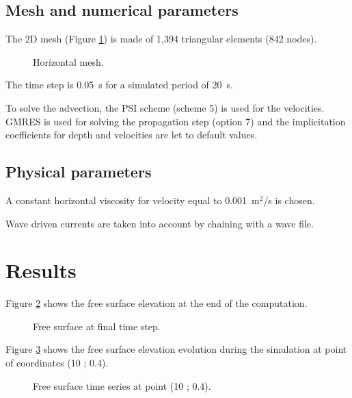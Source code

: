 \subsection{Mesh and numerical parameters}

The 2D mesh (Figure \ref{t2d:bj78:fig:mesh})
is made of 1,394 triangular elements (842 nodes).

\begin{figure}[!htbp]
 \centering
 \caption{Horizontal mesh.}
 \label{t2d:bj78:fig:mesh}
\end{figure}

The time step is 0.05~s for a simulated period of 20~s.

To solve the advection, the PSI scheme (scheme 5) is used for the velocities.
GMRES
is used for solving the propagation step (option 7) and
the implicitation coefficients
for depth and velocities are let to default values.

\subsection{Physical parameters}

A constant horizontal viscosity for velocity equal to 0.001~m$^2$/s is chosen.

Wave driven currents are taken into account by chaining  with
a wave file.

\section{Results}

Figure \ref{t2d:bj78:FreeSurf} shows the free surface elevation at the end of
the computation.

\begin{figure}[H]
  \centering
  \caption{Free surface at final time step.}
  \label{t2d:bj78:FreeSurf}
\end{figure}

Figure \ref{t2d:bj78:FreeSurfTimeSeries} shows the free surface elevation evolution
during the simulation at point of coordinates (10 ; 0.4).

\begin{figure}[H]
  \centering
  \caption{Free surface time series at point (10 ; 0.4).}
  \label{t2d:bj78:FreeSurfTimeSeries}
\end{figure}

